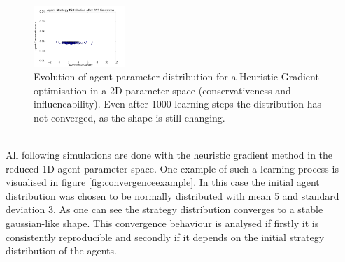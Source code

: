 \documentclass[11pt]{article}
\begin{document}
\begin{figure}
  \includegraphics[width=0.31\textwidth]{figures/2dsim_6.png}
  \caption[2D simulation]{Evolution of agent parameter distribution for a Heuristic Gradient optimisation in a 2D parameter space (conservativeness and influencability). Even after 1000 learning steps the distribution has not converged, as the shape is still changing.}
  \label{fig:2dsimulation}
\end{figure}

\hfill \\
All following simulations are done with the heuristic gradient method in the reduced 1D agent parameter space. One example of such a learning process is visualised in figure \ref{fig:convergenceexample}. In this case the initial agent distribution was chosen to be normally distributed with mean 5 and standard deviation 3. As one can see the strategy distribution converges to a stable gaussian-like shape. This convergence behaviour is analysed if firstly it is consistently reproducible and secondly if it depends on  the initial strategy distribution of the agents. \\
\end{document}

